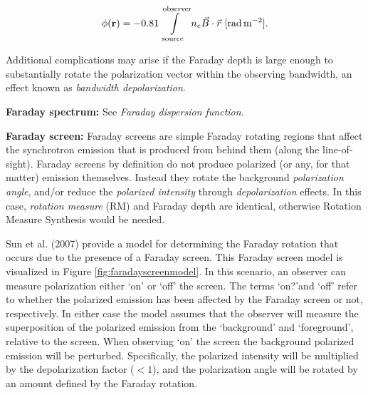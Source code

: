 \documentclass[a4paper,10pt]{article}
\begin{document}
\begin{align*}
    \phi(\mathbf{r}) = -0.81 \int\limits_\mathrm{source}^\mathrm{observer}n_e\vec{B}\cdot\vec{{\rm }r} ~ [{\rm rad\,m^{-2}}].
\end{align*}

{\noindent}Additional complications may arise if the Faraday depth is large enough to substantially rotate the polarization vector within the observing bandwidth, an effect known as \textit{bandwidth depolarization}.

{\noindent}\textbf{Faraday spectrum:} See \textit{Faraday dispersion function}.

{\noindent}\textbf{Faraday screen:} Faraday screens are simple Faraday rotating regions that affect the synchrotron emission that is produced from behind them (along the line-of-sight). Faraday screens by definition do not produce polarized (or any, for that matter) emission themselves. Instead they rotate the background \textit{polarization angle}, and/or reduce the \textit{polarized intensity} through \textit{depolarization} effects. In this case, \textit{rotation measure} (RM) and Faraday depth are identical, otherwise Rotation Measure Synthesis would be needed. 

{\noindent}Sun et al. (2007) provide a model for determining the Faraday rotation that occurs due to the presence of a Faraday screen. This Faraday screen model is visualized in Figure \ref{fig:faradayscreenmodel}. In this scenario, an observer can measure polarization either `on' or `off' the screen. The terms `on?'and `off' refer to whether the polarized emission has been affected by the Faraday screen or not, respectively. In either case the model assumes that the observer will measure the superposition of the polarized emission from the `background' and `foreground', relative to the screen. When observing `on' the screen the background polarized emission will be perturbed. Specifically, the polarized intensity will be multiplied by the depolarization factor ($<1$), and the polarization angle will be rotated by an amount defined by the Faraday rotation.
\end{document}

